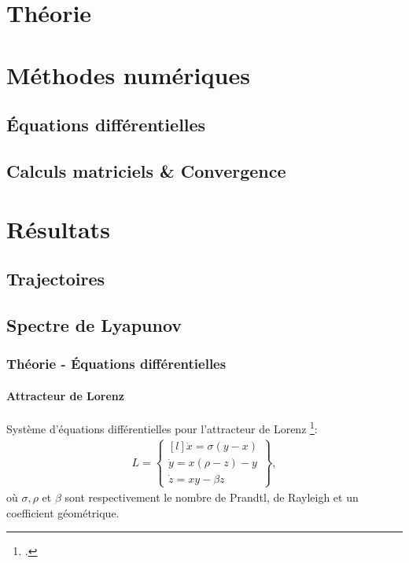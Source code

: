 \section{Théorie}

\section{Méthodes numériques}

\subsection{Équations différentielles}

\subsection{Calculs matriciels \& Convergence}

\section{Résultats}

\subsection{Trajectoires}

\subsection{Spectre de Lyapunov}

\begin{frame}
    \begin{center}
    \vspace{0.5cm}
    \end{center}
\end{frame}

\begin{frame}
    \frametitle{Théorie - Équations différentielles}
    \framesubtitle{Attracteur de Lorenz}
    Système d'équations différentielles pour l'attracteur de Lorenz \footcite{lorenz}:
    \begin{align}
            L =
            \begin{Bmatrix*}[l]
                \Dot{x} = \sigma(y - x) \\
                \Dot{y} = x(\rho - z) - y \\
                \Dot{z} = xy - \beta z
            \end{Bmatrix*},
    \end{align}
    où $\sigma, \rho$ et $\beta$ sont respectivement le nombre de Prandtl, de Rayleigh et un coefficient géométrique.
\end{frame}


